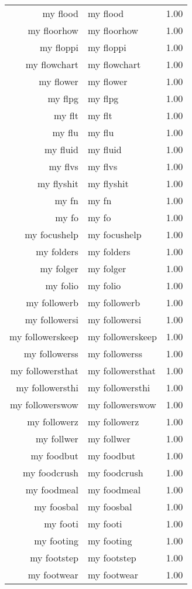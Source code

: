\begin{table}[ht]
\begin{tabular}{rlr}
  my flood & my flood & 1.00 \\ 
  my floorhow & my floorhow & 1.00 \\ 
  my floppi & my floppi & 1.00 \\ 
  my flowchart & my flowchart & 1.00 \\ 
  my flower & my flower & 1.00 \\ 
  my flpg & my flpg & 1.00 \\ 
  my flt & my flt & 1.00 \\ 
  my flu & my flu & 1.00 \\ 
  my fluid & my fluid & 1.00 \\ 
  my flvs & my flvs & 1.00 \\ 
  my flyshit & my flyshit & 1.00 \\ 
  my fn & my fn & 1.00 \\ 
  my fo & my fo & 1.00 \\ 
  my focushelp & my focushelp & 1.00 \\ 
  my folders & my folders & 1.00 \\ 
  my folger & my folger & 1.00 \\ 
  my folio & my folio & 1.00 \\ 
  my followerb & my followerb & 1.00 \\ 
  my followersi & my followersi & 1.00 \\ 
  my followerskeep & my followerskeep & 1.00 \\ 
  my followerss & my followerss & 1.00 \\ 
  my followersthat & my followersthat & 1.00 \\ 
  my followersthi & my followersthi & 1.00 \\ 
  my followerswow & my followerswow & 1.00 \\ 
  my followerz & my followerz & 1.00 \\ 
  my follwer & my follwer & 1.00 \\ 
  my foodbut & my foodbut & 1.00 \\ 
  my foodcrush & my foodcrush & 1.00 \\ 
  my foodmeal & my foodmeal & 1.00 \\ 
  my foosbal & my foosbal & 1.00 \\ 
  my footi & my footi & 1.00 \\ 
  my footing & my footing & 1.00 \\ 
  my footstep & my footstep & 1.00 \\ 
  my footwear & my footwear & 1.00 \\ 

\end{tabular}
\end{table}
